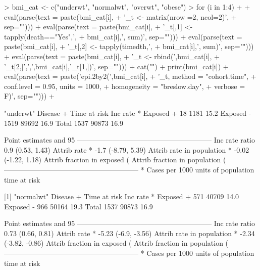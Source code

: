 \documentclass{article}
\begin{document}
\begin{Schunk}
\begin{Sinput}
> bmi_cat <- c("underwt", "normalwt", "overwt", "obese")
> for (i in 1:4)
+ {
+   eval(parse(text = paste(bmi_cat[i],
+                           '_t <- matrix(nrow =2, ncol=2)',
+                           sep="")))
+ 	eval(parse(text = paste(bmi_cat[i],
+                           '_t[,1] <- tapply(death=="Yes",',
+                           bmi_cat[i],', sum)', sep="")))
+ 	eval(parse(text = paste(bmi_cat[i],
+                           '_t[,2] <- tapply(timedth,',
+                           bmi_cat[i],', sum)', sep="")))
+ 	eval(parse(text = paste(bmi_cat[i],
+                           '_t <- rbind(',bmi_cat[i],
+                           '_t[2,]',',',bmi_cat[i],'_t[1,])', sep="")))
+   cat("\n\n")
+   print(bmi_cat[i])
+   eval(parse(text = paste('epi.2by2(',bmi_cat[i],
+                           '_t, method = "cohort.time",
+                           conf.level = 0.95, units = 1000,
+                           homogeneity = "breslow.day",
+                           verbose = F)', sep="")))
+ }
\end{Sinput}
\begin{Soutput}
[1] "underwt"
             Disease +    Time at risk        Inc rate *
Exposed +           18            1181              15.2
Exposed -         1519           89692              16.9
Total             1537           90873              16.9

Point estimates and 95 % CIs:
---------------------------------------------------------
Inc rate ratio                           0.9 (0.53, 1.43)
Attrib rate *                            -1.7 (-8.79, 5.39)
Attrib rate in population *              -0.02 (-1.22, 1.18)
Attrib fraction in exposed (%)           -11.16 (-88.07, 29.91)
Attrib fraction in population (%)        -0.13 (-0.16, -0.1)
---------------------------------------------------------
 * Cases per 1000 units of population time at risk 


[1] "normalwt"
             Disease +    Time at risk        Inc rate *
Exposed +          571           40709              14.0
Exposed -          966           50164              19.3
Total             1537           90873              16.9

Point estimates and 95 % CIs:
---------------------------------------------------------
Inc rate ratio                           0.73 (0.66, 0.81)
Attrib rate *                            -5.23 (-6.9, -3.56)
Attrib rate in population *              -2.34 (-3.82, -0.86)
Attrib fraction in exposed (%)           -37.29 (-52.52, -23.67)
Attrib fraction in population (%)        -13.85 (-15.35, -12.38)
---------------------------------------------------------
 * Cases per 1000 units of population time at risk 



\end{Soutput}
\end{Schunk}
\end{document}
